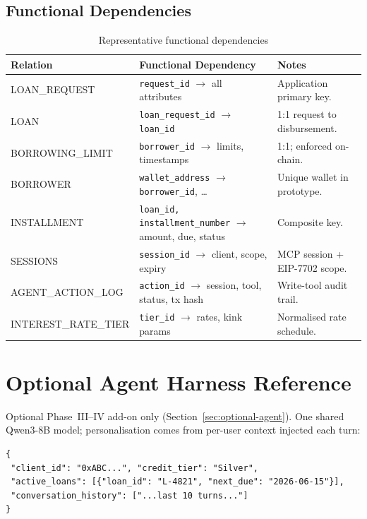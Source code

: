 \documentclass[12pt, a4paper]{report}
\newcommand{\tableheadcolor}{\rowcolor{TableHeadBg}}
\begin{document}
\section{Functional Dependencies}

\begin{table}[H]
\centering
\caption[Representative functional dependencies]{Representative functional dependencies}
\label{tab:functional-deps}
\footnotesize
\begin{tabular}{p{3cm}p{5.5cm}p{5cm}}
\toprule
\tableheadcolor
\textbf{Relation} & \textbf{Functional Dependency} & \textbf{Notes} \\
\midrule
LOAN\_REQUEST & \texttt{request\_id} $\to$ all attributes & Application primary key. \\
LOAN & \texttt{loan\_request\_id} $\to$ \texttt{loan\_id} & 1:1 request to disbursement. \\
BORROWING\_LIMIT & \texttt{borrower\_id} $\to$ limits, timestamps & 1:1; enforced on-chain. \\
BORROWER & \texttt{wallet\_address} $\to$ \texttt{borrower\_id}, \ldots & Unique wallet in prototype. \\
INSTALLMENT & \texttt{loan\_id, installment\_number} $\to$ amount, due, status & Composite key. \\
SESSIONS & \texttt{session\_id} $\to$ client, scope, expiry & MCP session + EIP-7702 scope. \\
AGENT\_ACTION\_LOG & \texttt{action\_id} $\to$ session, tool, status, tx hash & Write-tool audit trail. \\
INTEREST\_RATE\_TIER & \texttt{tier\_id} $\to$ rates, kink params & Normalised rate schedule. \\
\bottomrule
\end{tabular}
\end{table}

\chapter{Optional Agent Harness Reference}
\label{app:agent-harness}

Optional Phase~III--IV add-on only (Section~\ref{sec:optional-agent}). One shared Qwen3-8B model; personalisation comes from per-user context injected each turn:

\begin{verbatim}
{
 "client_id": "0xABC...", "credit_tier": "Silver",
 "active_loans": [{"loan_id": "L-4821", "next_due": "2026-06-15"}],
 "conversation_history": ["...last 10 turns..."]
}
\end{verbatim}
\end{document}
